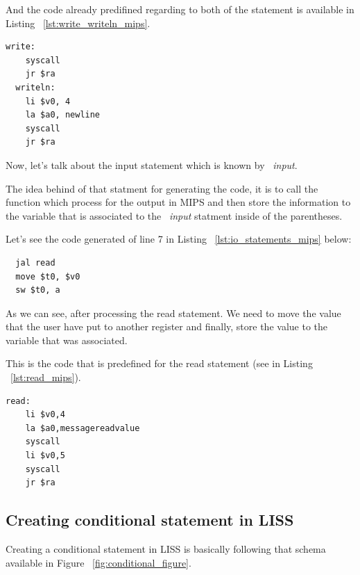 \documentclass[
  oneside,
  11pt, a4paper,
  footinclude=true,
  headinclude=true,
  cleardoublepage=empty
]{scrbook}
\begin{document}
And the code already predifined regarding to both of the statement is available in Listing ~\ref{lst:write_writeln_mips}.

\begin{lstlisting}[caption={MIPS assembly code of write and writeln},label={lst:write_writeln_mips}]
  write: 
	syscall
	jr $ra
  writeln: 
	li $v0, 4
	la $a0, newline
	syscall
	jr $ra
\end{lstlisting}

Now, let's talk about the input statement which is known by ~\textit{input}.

The idea behind of that statment for generating the code, it is to call the function which process for the output in MIPS and then store the information to the variable that is associated to the ~\textit{input} statment inside of the parentheses.

Let's see the code generated of line 7 in Listing ~\ref{lst:io_statements_mips} below:

\begin{lstlisting}
  jal read		
  move $t0, $v0		
  sw $t0, a		
\end{lstlisting}

As we can see, after processing the read statement. We need to move the value that the user have put to another register and finally, store the value to the variable that was associated.

This is the code that is predefined for the read statement (see in Listing ~\ref{lst:read_mips}).

\begin{lstlisting}[caption={Read statement code in MIPS},label={lst:read_mips}]
  read: 
    li $v0,4
    la $a0,messagereadvalue
    syscall
    li $v0,5
    syscall
    jr $ra
\end{lstlisting}

\subsection{Creating conditional statement in LISS}

Creating a conditional statement in LISS is basically following that schema available in Figure ~\ref{fig:conditional_figure}.
\end{document}
